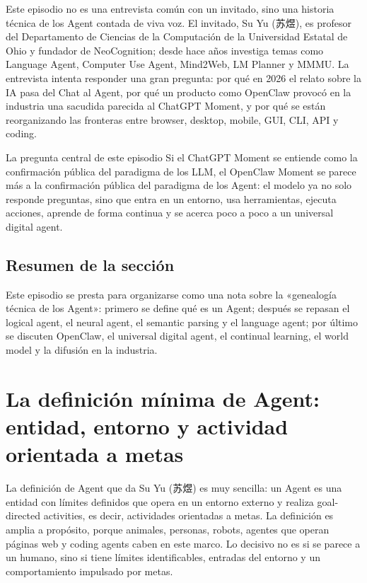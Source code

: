\documentclass[a4paper]{article}
\begin{document}
Este episodio no es una entrevista común con un invitado, sino una historia técnica de los Agent contada de viva voz. El invitado, Su Yu (苏煜), es profesor del Departamento de Ciencias de la Computación de la Universidad Estatal de Ohio y fundador de NeoCognition; desde hace años investiga temas como Language Agent, Computer Use Agent, Mind2Web, LM Planner y MMMU. La entrevista intenta responder una gran pregunta: por qué en 2026 el relato sobre la IA pasa del Chat al Agent, por qué un producto como OpenClaw provocó en la industria una sacudida parecida al ChatGPT Moment, y por qué se están reorganizando las fronteras entre browser, desktop, mobile, GUI, CLI, API y coding.

\begin{importantbox}{La pregunta central de este episodio}
Si el ChatGPT Moment se entiende como la confirmación pública del paradigma de los LLM, el OpenClaw Moment se parece más a la confirmación pública del paradigma de los Agent: el modelo ya no solo responde preguntas, sino que entra en un entorno, usa herramientas, ejecuta acciones, aprende de forma continua y se acerca poco a poco a un universal digital agent.
\end{importantbox}




\subsection{Resumen de la sección}

Este episodio se presta para organizarse como una nota sobre la «genealogía técnica de los Agent»: primero se define qué es un Agent; después se repasan el logical agent, el neural agent, el semantic parsing y el language agent; por último se discuten OpenClaw, el universal digital agent, el continual learning, el world model y la difusión en la industria.
\section{La definición mínima de Agent: entidad, entorno y actividad orientada a metas}

La definición de Agent que da Su Yu (苏煜) es muy sencilla: un Agent es una entidad con límites definidos que opera en un entorno externo y realiza goal-directed activities, es decir, actividades orientadas a metas. La definición es amplia a propósito, porque animales, personas, robots, agentes que operan páginas web y coding agents caben en este marco. Lo decisivo no es si se parece a un humano, sino si tiene límites identificables, entradas del entorno y un comportamiento impulsado por metas.
\end{document}
